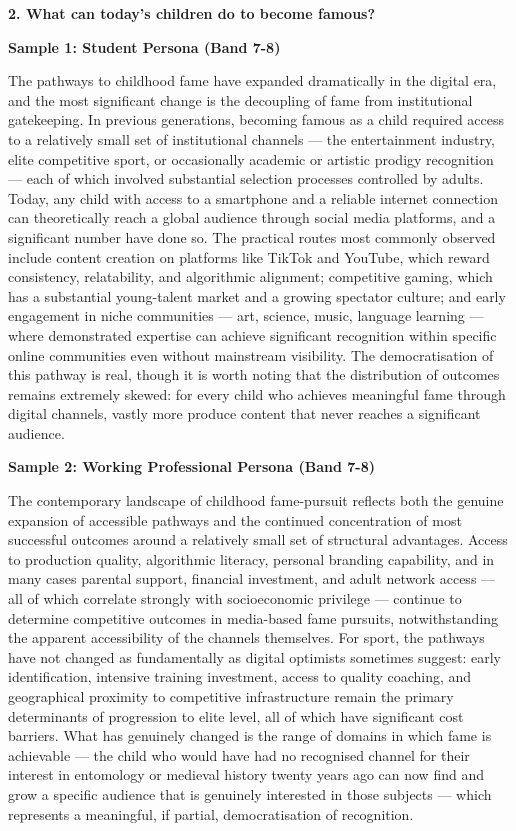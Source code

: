 \separator

\begin{ieltsquestion}
\textbf{2. What can today's children do to become famous?}
\end{ieltsquestion}
\textbf{Sample 1: Student Persona (Band 7-8)}

The pathways to childhood fame have expanded dramatically in the digital era, and the most significant change is the decoupling of fame from institutional gatekeeping. In previous generations, becoming famous as a child required access to a relatively small set of institutional channels — the entertainment industry, elite competitive sport, or occasionally academic or artistic prodigy recognition — each of which involved substantial selection processes controlled by adults. Today, any child with access to a smartphone and a reliable internet connection can theoretically reach a global audience through social media platforms, and a significant number have done so. The practical routes most commonly observed include content creation on platforms like TikTok and YouTube, which reward consistency, relatability, and algorithmic alignment; competitive gaming, which has a substantial young-talent market and a growing spectator culture; and early engagement in niche communities — art, science, music, language learning — where demonstrated expertise can achieve significant recognition within specific online communities even without mainstream visibility. The democratisation of this pathway is real, though it is worth noting that the distribution of outcomes remains extremely skewed: for every child who achieves meaningful fame through digital channels, vastly more produce content that never reaches a significant audience.

\textbf{Sample 2: Working Professional Persona (Band 7-8)}

The contemporary landscape of childhood fame-pursuit reflects both the genuine expansion of accessible pathways and the continued concentration of most successful outcomes around a relatively small set of structural advantages. Access to production quality, algorithmic literacy, personal branding capability, and in many cases parental support, financial investment, and adult network access — all of which correlate strongly with socioeconomic privilege — continue to determine competitive outcomes in media-based fame pursuits, notwithstanding the apparent accessibility of the channels themselves. For sport, the pathways have not changed as fundamentally as digital optimists sometimes suggest: early identification, intensive training investment, access to quality coaching, and geographical proximity to competitive infrastructure remain the primary determinants of progression to elite level, all of which have significant cost barriers. What has genuinely changed is the range of domains in which fame is achievable — the child who would have had no recognised channel for their interest in entomology or medieval history twenty years ago can now find and grow a specific audience that is genuinely interested in those subjects — which represents a meaningful, if partial, democratisation of recognition.

